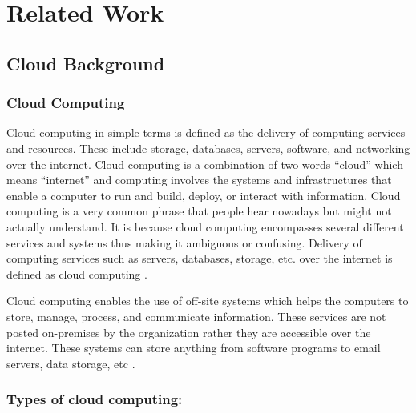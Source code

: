 
\chapter{Related Work}

\section{Cloud Background}

\subsection{Cloud Computing}
Cloud computing in simple terms is defined as the delivery of computing services and resources.
These include
storage, databases, servers, software, and networking over the internet.
Cloud computing is a combination of two
words “cloud” which means “internet” and computing involves the systems and infrastructures that enable a computer to run and build, deploy, or interact with information.
Cloud computing is a very common phrase that people hear nowadays but might not actually understand.
It is because cloud computing encompasses several different services and systems thus making it ambiguous or confusing.
Delivery of computing services such as servers, databases, storage, etc. over the internet is defined as cloud computing \cite{11}.

Cloud computing enables the use of off-site systems which helps the computers to store, manage, process, and
communicate information.
These services are not posted on-premises by the
organization rather they are accessible over the internet.
These systems can store anything from software programs to email servers, data storage, etc \cite{11}
\cite{12}.

\subsection{Types of cloud computing:}

